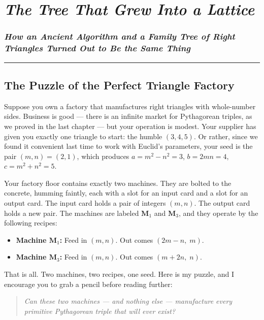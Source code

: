 \chapter{\texorpdfstring{\emph{The Tree That Grew Into a Lattice}}{The Tree That Grew Into a Lattice}}
\subsection{\texorpdfstring{\emph{How an Ancient Algorithm and a Family Tree of Right Triangles Turned Out to Be the Same Thing}}{How an Ancient Algorithm and a Family Tree of Right Triangles Turned Out to Be the Same Thing}}
\bigskip\noindent\rule{\linewidth}{0.4pt}\bigskip

\section{The Puzzle of the Perfect Triangle Factory}
Suppose you own a factory that manufactures right triangles with whole-number sides. Business is good --- there is an infinite market for Pythagorean triples, as we proved in the last chapter --- but your operation is modest. Your supplier has given you exactly one triangle to start: the humble \((3, 4, 5)\). Or rather, since we found it convenient last time to work with Euclid's parameters, your seed is the pair \((m, n) = (2, 1)\), which produces \(a = m^2 - n^2 = 3\), \(b = 2mn = 4\), \(c = m^2 + n^2 = 5\).

Your factory floor contains exactly two machines. They are bolted to the concrete, humming faintly, each with a slot for an input card and a slot for an output card. The input card holds a pair of integers \((m, n)\). The output card holds a new pair. The machines are labeled \(\mathbf{M}_1\) and \(\mathbf{M}_3\), and they operate by the following recipes:

\begin{itemize}
\tightlist
\item
  \textbf{Machine \(\mathbf{M}_1\):} Feed in \((m, n)\). Out comes \((2m - n,\; m)\).
\item
  \textbf{Machine \(\mathbf{M}_3\):} Feed in \((m, n)\). Out comes \((m + 2n,\; n)\).
\end{itemize}

That is all. Two machines, two recipes, one seed. Here is my puzzle, and I encourage you to grab a pencil before reading further:

\begin{quote}
\emph{Can these two machines --- and nothing else --- manufacture every primitive Pythagorean triple that will ever exist?}
\end{quote}

